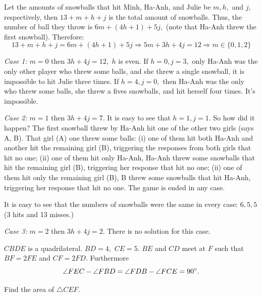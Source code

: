 \documentclass{article}
\begin{document}
\begin{soln}
    Let the amounts of snowballs that hit Minh, Ha-Anh, and Julie be $m, h,$ and $j,$ respectively,
    then $13 + m + h + j$ is the total amount of snowballs.
    Thus, the number of ball they throw is $6m + (4h + 1) + 5j,$ (note that Ha-Anh threw the first snowball).
    Therefore:
    \[
        13 + m + h + j = 6m + (4h + 1) + 5j \Rightarrow 5m + 3h + 4j = 12 \Rightarrow m \in \{0, 1, 2\}
    \]

    \textit{Case 1:} $m=0$ then $3h+4j=12,$ $h$ is even.
    If $h=0, j=3,$ only Ha-Anh was the only other player who threw some balls, and she threw a single snowball, it is impossible to hit Julie three times.
    If $h=4, j=0,$ then Ha-Anh was the only who threw some balls, she threw a fives snowballs, and hit herself four times. It's impossible.

    \textit{Case 2:} $m=1$ then $3h+4j=7.$ It is easy to see that $h=1, j=1.$ So how did it happen?
    The first snowball threw by Ha-Anh hit one of the other two girls (says A, B). That girl (A) one threw some balls:
    (i) one of them hit both Ha-Anh and another hit the remaining girl (B), triggering the responses from both girls that hit no one;
    (ii) one of them hit only Ha-Anh, Ha-Anh threw some snowballs that hit the remaining girl (B), triggering her response that hit no one;
    (ii) one of them hit only  the remaining girl (B), B threw some snowballs that hit Ha-Anh, triggering her response that hit no one.
    The game is ended in any case.

    It is easy to see that the numbers of snowballs were the same in every case: $\boxed{6, 5, 5}$
    (3 hits and 13 misses.)

    \textit{Case 3:} $m=2$ then $3h+4j=2.$ There is no solution for this case.
\end{soln}

\begin{problem}
    $CBDE$ is a quadrilateral. $BD=4,$ $CE=5.$ $BE$ and $CD$ meet at $F$ such that $BF = 2FE$ and $CF = 2 FD.$ Furthermore
    \[
        \angle FEC - \angle FBD = \angle FDB - \angle FCE = 90^\circ. 
    \]

    Find the area of $\triangle CEF.$
\end{problem}
\end{document}
